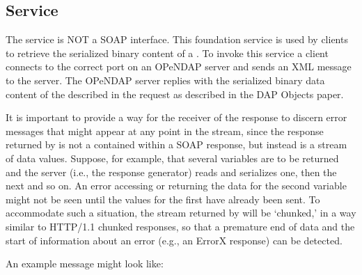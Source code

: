 \documentclass[justify]{dods-paper}
\begin{document}
   
    


\subsection {\GetBlob Service}
\label {getBlob}

The \GetBlob service is NOT a SOAP interface. This foundation service
is used by clients to retrieve the serialized binary content of a
\Dataset. To invoke this service a client connects to the correct port
on an OPeNDAP server and sends an XML message to the server. The
OPeNDAP server replies with the serialized binary data content of the
\Dataset described in the request as described in the DAP Objects
paper.

It is important to provide a way for the receiver of the \GetBlob
response to discern error messages that might appear at any point in
the stream, since the response returned by \GetBlob is not a contained
within a SOAP response, but instead is a stream of data values.
Suppose, for example, that several variables are to be returned and
the server (i.e., the \GetBlob response generator) reads and
serializes one, then the next and so on. An error accessing or
returning the data for the second variable might not be seen until the
values for the first have already been sent. To accommodate such a
situation, the stream returned by \GetBlob will be `chunked,' in a way
similar to HTTP/1.1 chunked responses, so that a premature end of data
and the start of information about an error (e.g., an ErrorX response)
can be detected.

An example \GetBlob message might look like:
\end{document}
